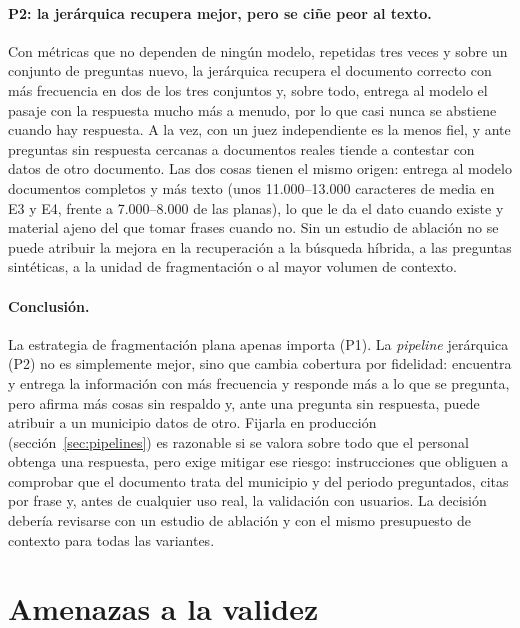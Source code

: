\paragraph{P2: la jerárquica recupera mejor, pero se ciñe peor al texto.} Con métricas que no dependen de ningún modelo, repetidas tres veces y sobre un conjunto de preguntas nuevo, la jerárquica recupera el documento correcto con más frecuencia en dos de los tres conjuntos y, sobre todo, entrega al modelo el pasaje con la respuesta mucho más a menudo, por lo que casi nunca se abstiene cuando hay respuesta. A la vez, con un juez independiente es la menos fiel, y ante preguntas sin respuesta cercanas a documentos reales tiende a contestar con datos de otro documento. Las dos cosas tienen el mismo origen: entrega al modelo documentos completos y más texto (unos 11.000--13.000 caracteres de media en E3 y E4, frente a 7.000--8.000 de las planas), lo que le da el dato cuando existe y material ajeno del que tomar frases cuando no. Sin un estudio de ablación no se puede atribuir la mejora en la recuperación a la búsqueda híbrida, a las preguntas sintéticas, a la unidad de fragmentación o al mayor volumen de contexto.

\paragraph{Conclusión.} La estrategia de fragmentación plana apenas importa (P1). La \emph{pipeline} jerárquica (P2) no es simplemente mejor, sino que cambia cobertura por fidelidad: encuentra y entrega la información con más frecuencia y responde más a lo que se pregunta, pero afirma más cosas sin respaldo y, ante una pregunta sin respuesta, puede atribuir a un municipio datos de otro. Fijarla en producción (sección~\ref{sec:pipelines}) es razonable si se valora sobre todo que el personal obtenga una respuesta, pero exige mitigar ese riesgo: instrucciones que obliguen a comprobar que el documento trata del municipio y del periodo preguntados, citas por frase y, antes de cualquier uso real, la validación con usuarios. La decisión debería revisarse con un estudio de ablación y con el mismo presupuesto de contexto para todas las variantes.

\section{Amenazas a la validez}
\label{sec:validez}

